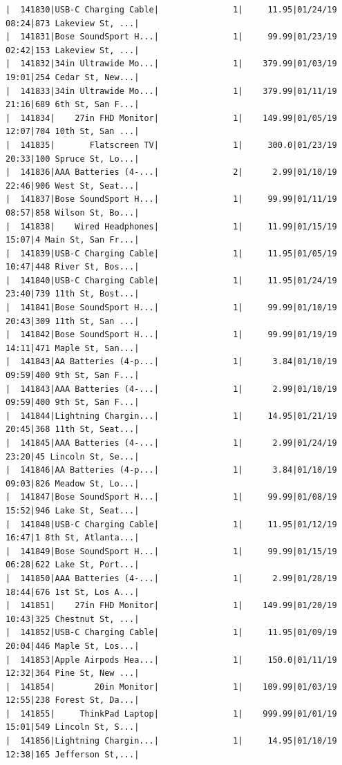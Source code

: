 \documentclass[
  letterpaper,
  DIV=11,
  numbers=noendperiod]{scrartcl}
\begin{document}
\begin{verbatim}
|  141830|USB-C Charging Cable|               1|     11.95|01/24/19 08:24|873 Lakeview St, ...|
|  141831|Bose SoundSport H...|               1|     99.99|01/23/19 02:42|153 Lakeview St, ...|
|  141832|34in Ultrawide Mo...|               1|    379.99|01/03/19 19:01|254 Cedar St, New...|
|  141833|34in Ultrawide Mo...|               1|    379.99|01/11/19 21:16|689 6th St, San F...|
|  141834|    27in FHD Monitor|               1|    149.99|01/05/19 12:07|704 10th St, San ...|
|  141835|       Flatscreen TV|               1|     300.0|01/23/19 20:33|100 Spruce St, Lo...|
|  141836|AAA Batteries (4-...|               2|      2.99|01/10/19 22:46|906 West St, Seat...|
|  141837|Bose SoundSport H...|               1|     99.99|01/11/19 08:57|858 Wilson St, Bo...|
|  141838|    Wired Headphones|               1|     11.99|01/15/19 15:07|4 Main St, San Fr...|
|  141839|USB-C Charging Cable|               1|     11.95|01/05/19 10:47|448 River St, Bos...|
|  141840|USB-C Charging Cable|               1|     11.95|01/24/19 23:40|739 11th St, Bost...|
|  141841|Bose SoundSport H...|               1|     99.99|01/10/19 20:43|309 11th St, San ...|
|  141842|Bose SoundSport H...|               1|     99.99|01/19/19 14:11|471 Maple St, San...|
|  141843|AA Batteries (4-p...|               1|      3.84|01/10/19 09:59|400 9th St, San F...|
|  141843|AAA Batteries (4-...|               1|      2.99|01/10/19 09:59|400 9th St, San F...|
|  141844|Lightning Chargin...|               1|     14.95|01/21/19 20:45|368 11th St, Seat...|
|  141845|AAA Batteries (4-...|               1|      2.99|01/24/19 23:20|45 Lincoln St, Se...|
|  141846|AA Batteries (4-p...|               1|      3.84|01/10/19 09:03|826 Meadow St, Lo...|
|  141847|Bose SoundSport H...|               1|     99.99|01/08/19 15:52|946 Lake St, Seat...|
|  141848|USB-C Charging Cable|               1|     11.95|01/12/19 16:47|1 8th St, Atlanta...|
|  141849|Bose SoundSport H...|               1|     99.99|01/15/19 06:28|622 Lake St, Port...|
|  141850|AAA Batteries (4-...|               1|      2.99|01/28/19 18:44|676 1st St, Los A...|
|  141851|    27in FHD Monitor|               1|    149.99|01/20/19 10:43|325 Chestnut St, ...|
|  141852|USB-C Charging Cable|               1|     11.95|01/09/19 20:04|446 Maple St, Los...|
|  141853|Apple Airpods Hea...|               1|     150.0|01/11/19 12:32|364 Pine St, New ...|
|  141854|        20in Monitor|               1|    109.99|01/03/19 12:55|238 Forest St, Da...|
|  141855|     ThinkPad Laptop|               1|    999.99|01/01/19 15:01|549 Lincoln St, S...|
|  141856|Lightning Chargin...|               1|     14.95|01/10/19 12:38|165 Jefferson St,...|

\end{verbatim}
\end{document}
